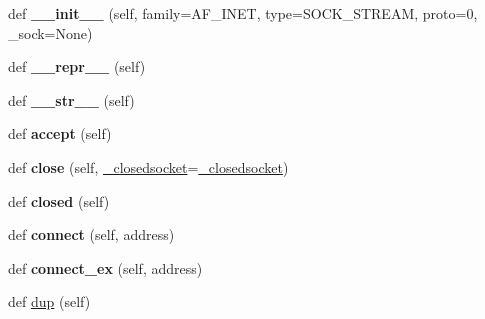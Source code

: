 \begin{DoxyCompactItemize}
\item 
\mbox{\label{classgevent_1_1__socket2_1_1socket_a9dc4a684cc35025a2a8c71cf83cf1b27}} 
def {\bfseries \+\_\+\+\_\+init\+\_\+\+\_\+} (self, family=A\+F\+\_\+\+I\+N\+ET, type=S\+O\+C\+K\+\_\+\+S\+T\+R\+E\+AM, proto=0, \+\_\+sock=None)
\item 
\mbox{\label{classgevent_1_1__socket2_1_1socket_a3c832cf270113243ee2f5e8a726c3aec}} 
def {\bfseries \+\_\+\+\_\+repr\+\_\+\+\_\+} (self)
\item 
\mbox{\label{classgevent_1_1__socket2_1_1socket_a4bef8db8a816438b1229b768fb2687e0}} 
def {\bfseries \+\_\+\+\_\+str\+\_\+\+\_\+} (self)
\item 
\mbox{\label{classgevent_1_1__socket2_1_1socket_a847c5664623bb26df20caf1da5a880a9}} 
def {\bfseries accept} (self)
\item 
\mbox{\label{classgevent_1_1__socket2_1_1socket_a39d9754759ffbecc32c3ceb1edc4853c}} 
def {\bfseries close} (self, \hyperlink{classgevent_1_1__socket2_1_1__closedsocket}{\+\_\+closedsocket}=\hyperlink{classgevent_1_1__socket2_1_1__closedsocket}{\+\_\+closedsocket})
\item 
\mbox{\label{classgevent_1_1__socket2_1_1socket_acf2219e33991dafea5e8fd27a52d75b4}} 
def {\bfseries closed} (self)
\item 
\mbox{\label{classgevent_1_1__socket2_1_1socket_aa7a16b19636ce1df30b648d9067f9831}} 
def {\bfseries connect} (self, address)
\item 
\mbox{\label{classgevent_1_1__socket2_1_1socket_a30fb4d1f4a6876f7f1d6f8f302f33187}} 
def {\bfseries connect\+\_\+ex} (self, address)
\item 
def \hyperlink{classgevent_1_1__socket2_1_1socket_a9c65f4bce0a2d18a552e1f55744ebff5}{dup} (self)
\item 
\mbox{\label{classgevent_1_1__socket2_1_1socket_a807af77016552894c695374d7454003d}} 

\end{DoxyCompactItemize}
